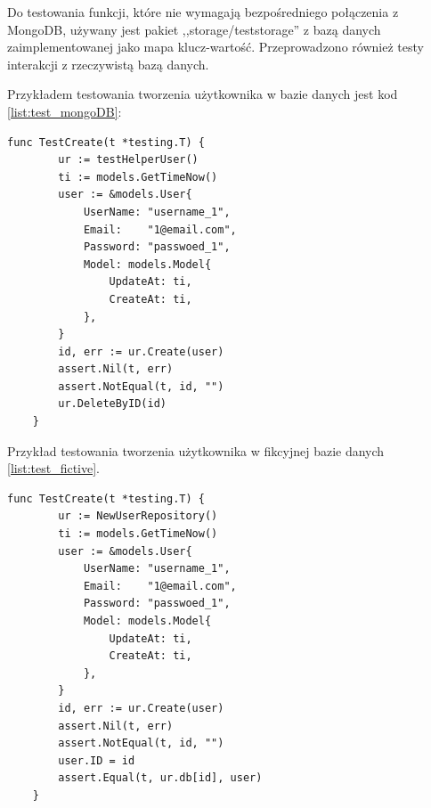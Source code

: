 Do testowania funkcji, które nie wymagają bezpośredniego połączenia z MongoDB, używany jest pakiet ,,storage/teststorage'' z bazą danych zaimplementowanej jako mapa klucz-wartość. Przeprowadzono również testy interakcji z rzeczywistą bazą danych.

Przykładem testowania tworzenia użytkownika w bazie danych jest kod \ref{list:test_mongoDB}:
\begin{lstlisting}[label=list:test_mongoDB,caption=Kod testowania tworzenia użytkownika w MongoDB,basicstyle=\tiny\ttfamily]
    func TestCreate(t *testing.T) {
        ur := testHelperUser()
        ti := models.GetTimeNow()
        user := &models.User{
            UserName: "username_1",
            Email:    "1@email.com",
            Password: "passwoed_1",
            Model: models.Model{
                UpdateAt: ti,
                CreateAt: ti,
            },
        }
        id, err := ur.Create(user)
        assert.Nil(t, err)
        assert.NotEqual(t, id, "")
        ur.DeleteByID(id)
    }
\end{lstlisting}

Przykład testowania tworzenia użytkownika w fikcyjnej bazie danych \ref{list:test_fictive}.
\begin{lstlisting}[label=list:test_fictive,caption=Kod testowania tworzenia użytkownika w fikcyjnej bazie danych,basicstyle=\tiny\ttfamily]
    func TestCreate(t *testing.T) {
        ur := NewUserRepository()
        ti := models.GetTimeNow()
        user := &models.User{
            UserName: "username_1",
            Email:    "1@email.com",
            Password: "passwoed_1",
            Model: models.Model{
                UpdateAt: ti,
                CreateAt: ti,
            },
        }
        id, err := ur.Create(user)
        assert.Nil(t, err)
        assert.NotEqual(t, id, "")
        user.ID = id
        assert.Equal(t, ur.db[id], user)
    }
\end{lstlisting}

